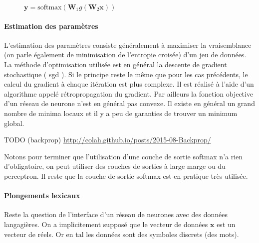 \documentclass[11pt,openany]{book}
\newcommand{\ac}[1]{{\sc #1}} %
\begin{document}
\begin{figure}[htbp]
\begin{center}
{
}
\end{center}
\caption{\label{fig-ffwd}$\mathbf{y} = \text{softmax}(\mathbf{W}_1 g(\mathbf{W}_2\mathbf{x} ) )$}
\end{figure}

\paragraph{Estimation des paramètres} L'estimation des paramètres 
consiste généralement à maximiser la vraisemblance (on parle également
de minimisation de l'entropie croisée) d'un jeu de données. 
La méthode d'optimisation utilisée est en général la descente de gradient
stochastique ( \ac{sgd} ).
Si le principe reste le même que pour les cas précédents, le calcul du
gradient à chaque itération est plus complexe. Il est réalisé à l'aide
d'un algorithme appelé rétropropagation du gradient. Par ailleurs la
fonction objective d'un réseau de neurone n'est en général pas
convexe. Il existe en général un grand nombre de minima locaux et il y
a peu de garanties de trouver un minimum global. 

TODO (backprop) \url{http://colah.github.io/posts/2015-08-Backprop/}



Notons pour terminer que l'utilisation d'une couche de sortie softmax
n'a rien d'obligatoire, on peut utiliser des couches de sorties à
large marge ou du perceptron. Il reste que la couche de sortie softmax
est en pratique très utilisée.

\paragraph{Plongements lexicaux}
Reste la question de l'interface d'un réseau de neurones avec des
données langagières. On a implicitement supposé que le vecteur de
données $\mathbf{x}$ est un vecteur de réels. Or en \ac{tal} 
les données sont des symboles discrets (des mots). 
\end{document}
